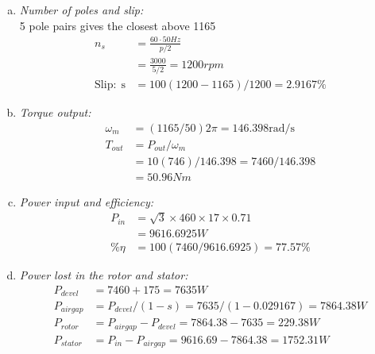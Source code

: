 \documentclass[a4paper,11pt]{article}
\begin{document}
\begin{enumerate}[a)]
    \item \textit{Number of poles and slip:}\\
          5 pole pairs gives the closest above 1165
          \begin{align*}
              n_s               & =\frac{60{\cdot}50Hz}{p/2}          \\
                                & =\frac{3000}{5/2} = 1200rpm   \\
              \mathrm{Slip:\;s} & =100(1200-1165)/1200=2.9167\%
          \end{align*}

    \item \textit{Torque output:}\\
          \begin{align*}
              \omega_m & = (1165/50)2\pi = 146.398 \mathrm{rad/s} \\
              T_{out}  & = P_{out}/\omega_m                       \\
                       & = 10(746)/146.398=7460/146.398
              \\&=50.96Nm
          \end{align*}

    \item \textit{Power input and efficiency:}\\
          \begin{align*}
              P_{in} & = \sqrt{3}\times460\times17\times0.71 \\
                     & =9616.6925W                           \\
              \%\eta & = 100(7460/9616.6925)=77.57\%
          \end{align*}

    \item \textit{Power lost in the rotor and stator:}\\
          \begin{align*}
              P_{devel}  & = 7460+175=7635W                               \\
              P_{airgap} & = P_{devel}/(1-s) = 7635/(1-0.029167)=7864.38W \\
              P_{rotor}  & = P_{airgap}-P_{devel} = 7864.38-7635=229.38W  \\
              P_{stator} & = P_{in}-P_{airgap}=9616.69-7864.38=1752.31W
          \end{align*}
\end{enumerate}
\end{document}

